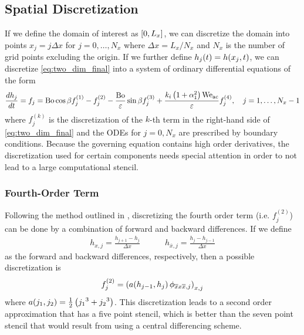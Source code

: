 \subsection{Spatial Discretization}
If we define the domain of interest as $\left[ 0, L_x \right]$, we can discretize the 
domain into points $x_j = j\Delta x$ for $j = 0, \ldots, N_x$ where 
$\Delta x = L_x / N_x$ and $N_x$ is the number of grid points excluding the origin. 
If we further define $h_j\!\left( t \right) = h\!\left( x_j, t \right)$, we can discretize 
\cref{eq:two_dim_final} into a system of ordinary differential equations of the form 
\begin{equation}
    \frac{d h_j}{d t} = f_j = \mathrm{Bo}\cos \beta f_j^{(1)} - f_j^{(2)} -  \frac{\mathrm{Bo}}{\varepsilon} \sin \beta f_j^{(3)} +  
    \frac{k_i \left( 1 + \alpha_1^2 \right) \mathrm{We_{ac}}}{\varepsilon} f_j^{(4)}, \quad j = 1, \ldots, N_x-1
    \label{eq:ode_sys}
\end{equation}
where $f_j^{(k)}$ is the discretization of the $k$-th term in
the right-hand side of \cref{eq:two_dim_final} and the ODEs for $j = 0, N_x$ are prescribed by boundary conditions. 
Because the governing equation 
contains high order derivatives, the discretization used for certain components 
needs special attention in order to not lead to a large computational stencil.

\subsubsection{Fourth-Order Term}
Following the method outlined in \cite{kondic2003instabilities}, discretizing the fourth order term (i.e.\! $f_j^{(2)}$) can be done by a combination
of forward and backward differences. If we define 
\begin{align*}
    h_{x, j} = \frac{h_{j+1} - h_j}{\Delta x} \quad \quad \quad h_{\overline{x}, j} = \frac{h_{j} - h_{j-1}}{\Delta x}
\end{align*}
as the forward and backward differences, respectively, then a possible discretization is 
\begin{equation}
    f_j^{\left( 2 \right)} = \left( a\!\left( h_{j-1}, h_j \right) \phi_{\overline{x}x\overline{x}, j} \right)_{x, j}
    \label{eq:f2_disc}
\end{equation}
where $a\!\left( j_1, j_2 \right) = \frac{1}{2} \left( {j_1}^3 + {j_2}^3 \right)$. This discretization leads to a 
second order approximation that has a five point stencil, which is better than the seven point stencil
that would result from using a central differencing scheme. 

